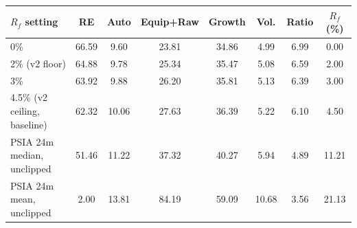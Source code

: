 \begin{tabular}{lccccccc}
\toprule
\textbf{$R_f$ setting} & RE & Auto & Equip+Raw & Growth & Vol. & Ratio & $R_f$ (\%) \\
\midrule
0\% & 66.59 & 9.60 & 23.81 & 34.86 & 4.99 & 6.99 & 0.00 \\
2\% (v2 floor) & 64.88 & 9.78 & 25.34 & 35.47 & 5.08 & 6.59 & 2.00 \\
3\% & 63.92 & 9.88 & 26.20 & 35.81 & 5.13 & 6.39 & 3.00 \\
4.5\% (v2 ceiling, baseline) & 62.32 & 10.06 & 27.63 & 36.39 & 5.22 & 6.10 & 4.50 \\
PSIA 24m median, unclipped & 51.46 & 11.22 & 37.32 & 40.27 & 5.94 & 4.89 & 11.21 \\
PSIA 24m mean, unclipped & 2.00 & 13.81 & 84.19 & 59.09 & 10.68 & 3.56 & 21.13 \\
\bottomrule
\end{tabular}
